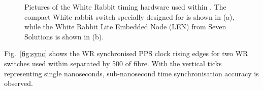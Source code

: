 \begin{figure} %
    \centering
    \quad
    \caption[Pictures of the White Rabbit timing hardware used within \chipsfive.]
    {Pictures of the White Rabbit timing hardware used within \chipsfive. The compact White rabbit
        switch specially designed for \chips is shown in (a), while the White Rabbit Lite Embedded
        Node (LEN) from Seven Solutions is shown in (b).}
    \label{fig:wr_electronics}
\end{figure}

Fig.~\ref{fig:sync} shows the WR synchronised PPS clock rising edges for two WR switches used
within \chipsfive separated by \unit{500}{} of fibre. With the vertical ticks
representing single nanoseconds, sub-nanosecond time synchronisation accuracy is observed.

